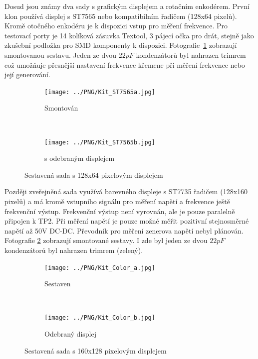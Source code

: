 Dosud jsou známy dva sady s grafickým displejem a rotačním enkodérem.
První klon používá displej s ST7565 nebo kompatibilním řadičem (128x64 pixelů).
Kromě otočného enkodéru je k dispozici vstup pro měření frekvence.
Pro testovací porty je 14 kolíková zásuvka Textool, 3 pájecí očka pro drát,
stejně jako zkušební podložka pro SMD komponenty k dispozici. 
Fotografie~\ref{fig:Kit_mono} zobrazují smontovanou sestavu. Jeden ze dvou \(22 pF\) kondenzátorů 
byl nahrazen trimrem což umožňuje přesnější nastavení frekvence křemene při měření
frekvence nebo její generování.
\begin{figure}[H]
  \begin{subfigure}[b]{.5\textwidth}
    \centering
    \texttt{[image: ../PNG/Kit\_ST7565a.jpg]}
    \caption{Smontován}
  \end{subfigure}
  ~
  \begin{subfigure}[b]{.5\textwidth}
    \centering
    \texttt{[image: ../PNG/Kit\_ST7565b.jpg]}
    \caption{s odebraným displejem}
  \end{subfigure}
  \caption{Sestavená sada s 128x64 pixelovým displejem}
  \label{fig:Kit_mono}
\end{figure}

Později zveřejněná sada využívá barevného displeje s ST7735 řadičem (128x160 pixelů) a má kromě
vstupního signálu pro měření napětí a frekvence ještě frekvenční výstup.
Frekvenční výstup není vyrovnán, ale je pouze paralelně připojen k TP2.
Při měření napětí je pouze možné měřit pozitivní stejnosměrné napětí až 50V DC-DC.
Převodník pro měření zenerova napětí nebyl plánován.
Fotografie \ref{fig:Kit_color} zobrazují smontované sestavy.
I zde byl jeden ze dvou \(22 pF\) kondenzátorů byl nahrazen trimrem (zelený). 

\begin{figure}[H]
  \begin{subfigure}[b]{.5\textwidth}
    \centering
    \texttt{[image: ../PNG/Kit\_Color\_a.jpg]}
    \caption{Sestaven}
  \end{subfigure}
  ~
  \begin{subfigure}[b]{.5\textwidth}
    \centering
    \texttt{[image: ../PNG/Kit\_Color\_b.jpg]}
    \caption{Odebraný displej}
  \end{subfigure}
  \caption{Sestavená sada s 160x128 pixelovým displejem}
  \label{fig:Kit_color}
\end{figure}

